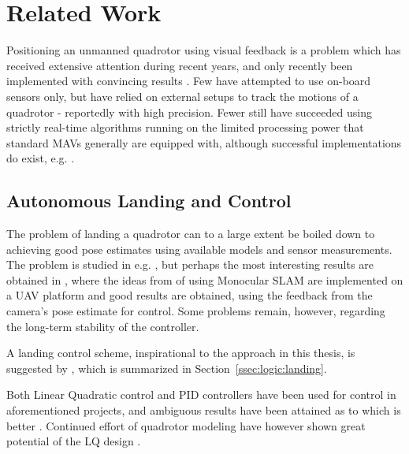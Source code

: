 \section{Related Work}
\label{sec:previouswork}

    Positioning an unmanned quadrotor using
    visual feedback is a problem which has received extensive attention
    during recent years, and only recently been implemented with convincing
    results \citep{DBLP:conf/icra/BloschWSS10,weiss11monocular}.
    Few have attempted to use on-board sensors only, but have relied on
    external setups to track the motions of a quadrotor - reportedly with high precision.
    Fewer still have succeeded using strictly real-time algorithms
    running on the limited processing power that standard
    MAVs generally are equipped with, although successful implementations do exist, e.g. \citep{Rudol10}.

    \subsection{Autonomous Landing and Control}
    The problem of landing a quadrotor can to a large extent be boiled
    down to achieving good pose estimates using available models and sensor measurements.
    The problem is studied in e.g. \citep{mellinger10perching,brockers:803111},
    but perhaps the most interesting results are obtained in \citep{DBLP:conf/icra/BloschWSS10,weiss11monocular},
    where the ideas from \citep{klein07parallel} of using Monocular SLAM
    are implemented on a UAV platform and good results are obtained,
    using the feedback from the camera's pose estimate for control.
    Some problems remain, however, regarding the long-term stability of the controller.

    A landing control scheme, inspirational to the approach in this thesis,
    is suggested by \citep{brockers:803111}, which is summarized in Section~\ref{ssec:logic:landing}.

    Both Linear Quadratic control and PID controllers have been used for control
    in aforementioned projects, and ambiguous results have been attained
    as to which is better \citep{bouabdallah04pid}. Continued effort of
    quadrotor modeling have however shown great potential of the LQ design \citep{bouabdallah07full}.

